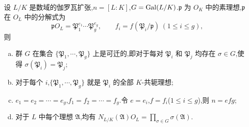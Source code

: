 \begin{theorem}\label{thm:2.12}
设 $L/K$ 是数域的伽罗瓦扩张,$n=[L:K]$,$G=\operatorname{Gal}(L/K)$.$\mathfrak{p}$ 为 $O_K$ 中的素理想,$\mathfrak{p}$ 在 $O_L$ 中的分解式为
\[
  \mathfrak{p}O_L=\mathfrak{P}_1^{e_1}\cdots\mathfrak{P}_g^{e_g},\qquad f_i=f(\mathfrak{P}_i/\mathfrak{p})\ (1\leqslant i\leqslant g),
\]
则
\begin{enumerate}[(a)]
  \item 群 $G$ 在集合 $\{\mathfrak{P}_1,\cdots,\mathfrak{P}_g\}$ 上是可迁的,即对于每对 $\mathfrak{P}_i$ 和 $\mathfrak{P}_j$ 均存在 $\sigma\in G$,使得 $\sigma(\mathfrak{P}_i)=\mathfrak{P}_j$;
  \item 对于每个 $i$,$\{\mathfrak{P}_1,\cdots,\mathfrak{P}_g\}$ 就是 $\mathfrak{P}_i$ 的全部 $K$-共轭理想;
  \item $e_1=e_2=\cdots=e_g$,$f_1=f_2=\cdots=f_g$.令 $e=e_i$,$f=f_i$($1\leqslant i\leqslant g$),则 $n=efg$;
  \item 对于 $L$ 中每个理想 $\mathfrak{A}$,均有 $N_{L/K}(\mathfrak{A})O_L=\prod_{\sigma\in G}\sigma(\mathfrak{A})$.
\end{enumerate}
\end{theorem}

